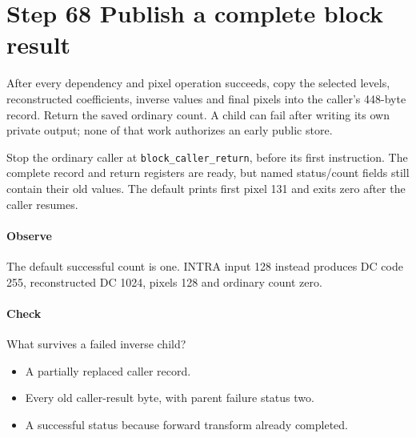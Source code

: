 \section{Step 68 Publish a complete block result}\label{h263-block-s08}
After every dependency and pixel operation succeeds, copy the selected levels,
reconstructed coefficients, inverse values and final pixels into the caller's
448-byte record. Return the saved ordinary count. A child can fail after writing
its own private output; none of that work authorizes an early public store.

Stop the ordinary caller at \texttt{block\_caller\_return}, before its first
instruction. The complete record and return registers are ready, but named
status/count fields still contain their old values. The default prints first
pixel 131 and exits zero after the caller resumes.

\paragraph{Observe} The default successful count is one. INTRA input 128 instead
produces DC code 255, reconstructed DC 1024, pixels 128 and ordinary count zero.
\paragraph{Check} What survives a failed inverse child?
\begin{itemize}
  \item[A.] A partially replaced caller record.
  \item[B.] Every old caller-result byte, with parent failure status two.
  \item[C.] A successful status because forward transform already completed.
\end{itemize}
